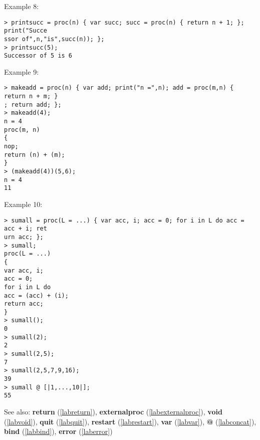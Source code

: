 \noindent Example 8: 
\begin{center}\begin{minipage}{15cm}\begin{Verbatim}[frame=single]
> printsucc = proc(n) { var succ; succ = proc(n) { return n + 1; }; print("Succe
ssor of",n,"is",succ(n)); };
> printsucc(5);
Successor of 5 is 6
\end{Verbatim}
\end{minipage}\end{center}
\noindent Example 9: 
\begin{center}\begin{minipage}{15cm}\begin{Verbatim}[frame=single]
> makeadd = proc(n) { var add; print("n =",n); add = proc(m,n) { return n + m; }
; return add; };
> makeadd(4);
n = 4
proc(m, n)
{
nop;
return (n) + (m);
}
> (makeadd(4))(5,6);
n = 4
11
\end{Verbatim}
\end{minipage}\end{center}
\noindent Example 10: 
\begin{center}\begin{minipage}{15cm}\begin{Verbatim}[frame=single]
> sumall = proc(L = ...) { var acc, i; acc = 0; for i in L do acc = acc + i; ret
urn acc; };
> sumall;
proc(L = ...)
{
var acc, i;
acc = 0;
for i in L do
acc = (acc) + (i);
return acc;
}
> sumall();
0
> sumall(2);
2
> sumall(2,5);
7
> sumall(2,5,7,9,16);
39
> sumall @ [|1,...,10|];
55
\end{Verbatim}
\end{minipage}\end{center}
See also: \textbf{return} (\ref{labreturn}), \textbf{externalproc} (\ref{labexternalproc}), \textbf{void} (\ref{labvoid}), \textbf{quit} (\ref{labquit}), \textbf{restart} (\ref{labrestart}), \textbf{var} (\ref{labvar}), \textbf{@} (\ref{labconcat}), \textbf{bind} (\ref{labbind}), \textbf{error} (\ref{laberror})
